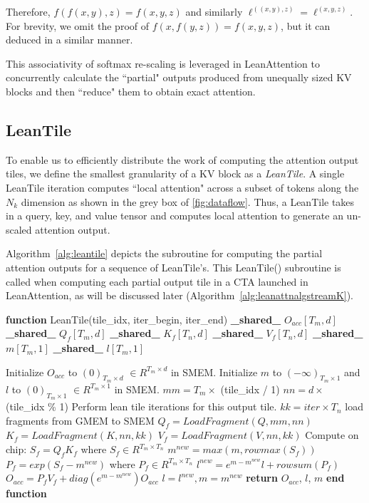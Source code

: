 \endgroup Therefore, $f(f(x,y), z) = f(x,y,z)$ and similarly $\ell^{((x,y),z)} = \ell^{(x,y,z)}$. For brevity, we omit the proof of $f(x, f(y, z)) = f(x,y,z)$, but it can deduced in a similar manner.

This associativity of softmax re-scaling is leveraged in LeanAttention to concurrently calculate the ``partial" outputs produced from unequally sized KV blocks and then ``reduce" them to obtain exact attention. \\

\subsection{LeanTile}
\label{subsec:leantile}
To enable us to efficiently distribute the work of computing the attention output tiles, we define the smallest granularity of a KV block as a \textit{LeanTile}. A single LeanTile iteration computes ``local attention" across a subset of tokens along the $N_k$ dimension as shown in the grey box of \autoref{fig:dataflow}. Thus, a LeanTile takes in a query, key, and value tensor and computes local attention to generate an un-scaled attention output.

Algorithm~\ref{alg:leantile} depicts the subroutine for computing the partial attention outputs for a sequence of LeanTile's. This LeanTile() subroutine is called when computing each partial output tile in a CTA launched in LeanAttention, as will be discussed later (Algorithm~\ref{alg:leanattnalgstreamK}).

\begin{algorithm}[tb]
   \caption{LeanTile() for a sequence of lean tile iterations.}
   \label{alg:leantile}
\begin{algorithmic}[1]
\STATE \textbf{function} LeanTile(tile\_idx, iter\_begin, iter\_end)
\STATE \textbf{\_shared\_} $O_{acc}[T_m, d]$
\STATE \textbf{\_shared\_} $Q_{f}[T_m, d]$
\STATE \textbf{\_shared\_} $K_{f}[T_n, d]$
\STATE \textbf{\_shared\_} $V_{f}[T_n, d]$
\STATE \textbf{\_shared\_} $m[T_m, 1]$
\STATE \textbf{\_shared\_} $l[T_m, 1]$

\STATE Initialize $O_{acc}$ to $(0)_{T_m \times d}$ $\in R^{T_m \times d}$ in SMEM.
\STATE Initialize $m$ to $(-\infty)_{T_m \times 1}$ and $l$ to $(0)_{T_m \times 1}$ $\in R^{T_m \times 1}$ in SMEM.
\STATE $mm = T_m \times$ (tile\_idx / 1) \STATE $nn = d \times$ (tile\_idx \% 1) \STATE Perform lean tile iterations for this output tile.
\STATE $kk = iter \times T_n$
\STATE load fragments from GMEM to SMEM \STATE $Q_{f} = LoadFragment(Q, mm, nn)$
\STATE $K_{f} = LoadFragment(K, nn, kk)$
\STATE $V_{f} = LoadFragment(V, nn, kk)$
\STATE Compute on chip: 
\STATE $S_{f} = Q_{f} K_{f}$ where $S_{f} \in R^{T_m \times T_n}$
\STATE $m^{new} = max(m, rowmax(S_{f}))$
\STATE $P_{f} = exp(S_{f} - m^{new})$  where $P_{f} \in R^{T_m \times T_n}$
\STATE $l^{new} = e^{m - m^{new}}l + rowsum(P_{f})$
\STATE $O_{acc} = P_{f} V_{f} + diag(e^{m - m^{new}}) O_{acc}$
\STATE $l = l^{new}, m = m^{new}$
\ENDFOR
\STATE \textbf{return} $O_{acc}$, $l$, $m$
\STATE \textbf{end function}
\end{algorithmic}
\end{algorithm}

